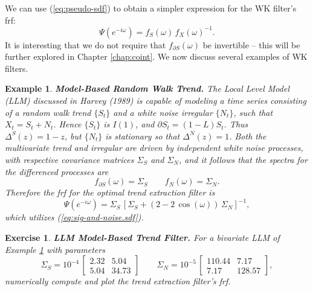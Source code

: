 \documentclass[a4paper]{book}
\newtheorem{Example}{Example}
\newtheorem{Exercise}{Exercise}
\begin{document}
\vspace{.5cm}

 We can use (\ref{eq:pseudo-sdf})   to obtain a simpler expression for the WK filter's frf:
\[
   \Psi (e^{-i \omega}) =    f_{ S} (\omega) \,     { f_{ X} (\omega) }^{-1}.
  \]
  It is interesting that we do not require that $f_{\partial S} (\omega)$ be 
  invertible -- this will be further explored in Chapter \ref{chap:coint}.
  We now discuss several examples of WK filters.

\begin{Example} {\bf Model-Based Random Walk Trend.} \rm
\label{exam:trend-i1}
  The Local Level Model (LLM) discussed in Harvey (1989) is capable
  of modeling a time series consisting
 of a  random walk trend $\{ S_t \}$ and a     white noise irregular
 $\{ N_t \}$, such  that $X_t = S_t + N_t$. 
  Hence $\{ S_t \}$ is $I(1)$, and $\partial S_t = (1-L) S_t$.
  Thus $\Delta^S (z) = 1- z$, but $\{ N_t \}$ is stationary so that
  $\Delta^N (z) = 1$.  
 Both the multivariate trend and  irregular are driven by independent 
 white noise processes, with respective covariance matrices
   $\Sigma_{S}$ and $\Sigma_{N}$,
  and it follows that the spectra for the differenced processes 
   are
  \[
    f_{\partial S} (\omega) = \Sigma_S \qquad f_{N} (\omega) = \Sigma_N.
\]
  Therefore  the frf for the optimal trend extraction filter is
\[ 
 \Psi (e^{-i \omega}) = \Sigma_{S} \, 
 { \left[ \Sigma_{S} + (2 - 2 \, \cos (\omega)) \, \Sigma_{N} \right] }^{-1},
\]
 which utilizes (\ref{eq:sig-and-noise.sdf}).
 \end{Example}

\begin{Exercise} {\bf LLM Model-Based Trend Filter.} \rm
\label{exer:trend-i1}
 For a bivariate LLM of Example \ref{exer:trend-i1} with parameters 
\[
 \Sigma_{S} = 10^{-4} \,\left[ \begin{array}{ll} 
   2.32  &  5.04  \\
   5.04  & 34.73   \end{array}  \right]
 \qquad  \Sigma_{N} = 10^{-5} \, \left[ \begin{array}{ll}
        110.44   &  7.17  \\
        7.17     & 128.57   \end{array} \right],
\]
 numerically compute and plot the trend extraction filter's frf.
\end{Exercise}
\end{document}
